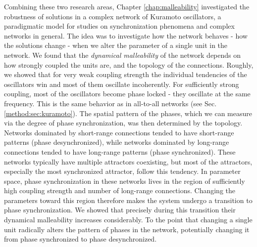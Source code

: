 Combining these two research areas, Chapter \ref{chap:malleability} investigated the robustness of solutions in a complex network of Kuramoto oscillators, a paradigmatic model for studies on synchronization phenomena and complex networks in general. The idea was to investigate how the network behaves - how the solutions change - when we alter the parameter of a single unit in the network. We found that the \textit{dynamical malleability} of the network depends on how strongly coupled the units are, and the topology of the connections. 
Roughly, we showed that for very weak coupling strength the individual tendencies of the oscillators win and most of them oscillate incoherently. For sufficiently strong coupling, most of the oscillators become phase locked - they oscillate at the same frequency. This is the same behavior as in all-to-all networks (see Sec.\ref{method:sec:kuramoto}). The spatial pattern of the phases, which we can measure via the degree of phase synchronization, was then determined by the topology. Networks dominated by short-range connections tended to have short-range patterns (phase desynchronized), while networks dominated by long-range connections tended to have long-range patterns (phase synchronized). These networks typically have multiple attractors coexisting, but most of the attractors, especially the most synchronized attractor, follow this tendency.
In parameter space, phase synchronization in these networks lives in the region of sufficiently high coupling strength and number of long-range connections. Changing the parameters toward this region therefore makes the system undergo a transition to phase synchronization. We showed that precisely during this transition their dynamical malleability increases considerably. To the point that changing a single unit radically alters the pattern of phases in the network, potentially changing it from phase synchronized to phase desynchronized. 

